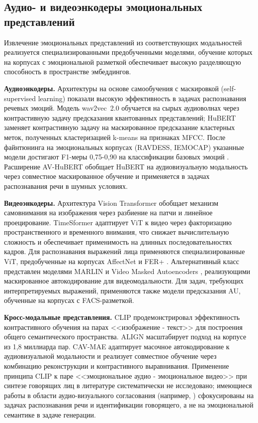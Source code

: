 \documentclass[a4paper, 12pt, oneside, openany]{article}
\begin{document}
\subsection{Аудио- и видеоэнкодеры эмоциональных представлений}

Извлечение эмоциональных представлений из соответствующих модальностей реализуется специализированными предобученными моделями, обучение которых на корпусах с эмоциональной разметкой обеспечивает высокую разделяющую способность в пространстве эмбеддингов.

\textbf{Аудиоэнкодеры.} Архитектуры на основе самообучения с маскировкой (self-supervised learning) показали высокую эффективность в задачах распознавания речевых эмоций. Модель wav2vec~2.0 \cite{baevski2020wav2vec} обучается на сырых аудиоволнах через контрастивную задачу предсказания квантованных представлений; HuBERT \cite{hsu2021hubert} заменяет контрастивную задачу на маскированное предсказание кластерных меток, полученных кластеризацией k-means на признаках MFCC. После файнтюнинга на эмоциональных корпусах (RAVDESS, IEMOCAP) указанные модели достигают F1-меры 0,75-0,90 на классификации базовых эмоций \cite{pepino2021}. Расширение AV-HuBERT \cite{shi2022avhubert} обобщает HuBERT на аудиовизуальную модальность через совместное маскированное обучение и применяется в задачах распознавания речи в шумных условиях.

\textbf{Видеоэнкодеры.} Архитектура Vision Transformer \cite{dosovitskiy2021vit} обобщает механизм самовнимания на изображения через разбиение на патчи и линейное проецирование. TimeSformer \cite{bertasius2021timesformer} адаптирует ViT к видео через факторизацию пространственного и временного внимания, что снижает вычислительную сложность и обеспечивает применимость на длинных последовательностях кадров. Для распознавания выражений лица применяются специализированные ViT, предобученные на корпусах AffectNet \cite{mollahosseini2017affectnet} и FER+ \cite{barsoum2016ferplus}. Альтернативный класс представлен моделями MARLIN \cite{cai2023marlin} и Video Masked Autoencoders \cite{tong2022videomae}, реализующими маскированное автокодирование для видеомодальности. Для задач, требующих интерпретируемых выражений, применяются также модели предсказания AU, обученные на корпусах с FACS-разметкой.

\textbf{Кросс-модальные представления.} CLIP \cite{radford2021clip} продемонстрировал эффективность контрастивного обучения на парах <<изображение - текст>> для построения общего семантического пространства. ALIGN \cite{jia2021align} масштабирует подход на корпусе из 1,8 миллиарда пар. CAV-MAE \cite{gong2023cavmae} адаптирует масочное автокодирование к аудиовизуальной модальности и реализует совместное обучение через комбинацию реконструкции и контрастивного выравнивания. Применение принципа CLIP к паре <<эмоциональное аудио - эмоциональное видео>> при синтезе говорящих лиц в литературе систематически не исследовано; имеющиеся работы в области аудио-визуального согласования (например, \cite{owens2018}) сфокусированы на задачах распознавания речи и идентификации говорящего, а не на эмоциональной семантике в задаче генерации.
\end{document}
